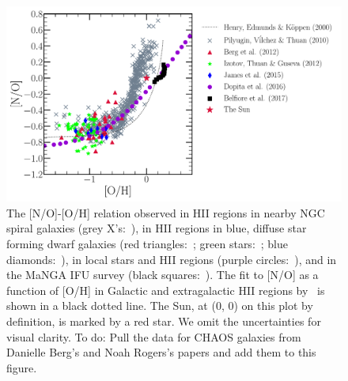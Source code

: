 \documentclass[ms.tex]{subfiles}
\begin{document}
\begin{figure} 
\centering 
\includegraphics[scale = 0.5]{no_oh_observed.pdf} 
\caption{ 
The [N/O]-[O/H] relation observed in HII regions in nearby NGC spiral galaxies 
(grey X's:~\citealp*{Pilyugin2010}), in HII regions in blue, diffuse star 
forming dwarf galaxies (red triangles:~\citealp{Berg2012}; 
green stars:~\citealp*{Izotov2012}; blue diamonds:~\citealp{James2015}), in 
local stars and HII regions (purple circles:~\citealp{Dopita2016}), and in the 
MaNGA IFU survey (black squares:~\citealp{Belfiore2017}). 
The fit to [N/O] as a function of [O/H] in Galactic and extragalactic HII 
regions by~\citet*{Henry2000} is shown in a black dotted line. 
The Sun, at (0, 0) on this plot by definition, is marked by a red star. 
We omit the uncertainties for visual clarity. 
{\color{red} To do: Pull the data for CHAOS galaxies from Danielle Berg's 
and Noah Rogers's papers and add them to this figure. 
} 
} 
\label{fig:no_oh_observed} 
\end{figure} 
\end{document}
